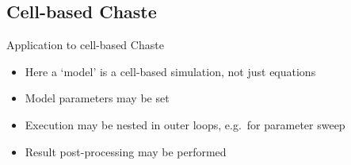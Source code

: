\documentclass[t,xcolor={usenames,dvipsnames}]{beamer}
\begin{document}
\subsection{Cell-based Chaste}

\begin{frame}{Application to cell-based Chaste}
\begin{itemize}
\item Here a `model' is a cell-based \alert{simulation}, not just equations
\item Model parameters may be set
\item Execution may be nested in outer loops, e.g.\ for parameter sweep
\item Result post-processing may be performed
\end{itemize}
\end{frame}
\end{document}
